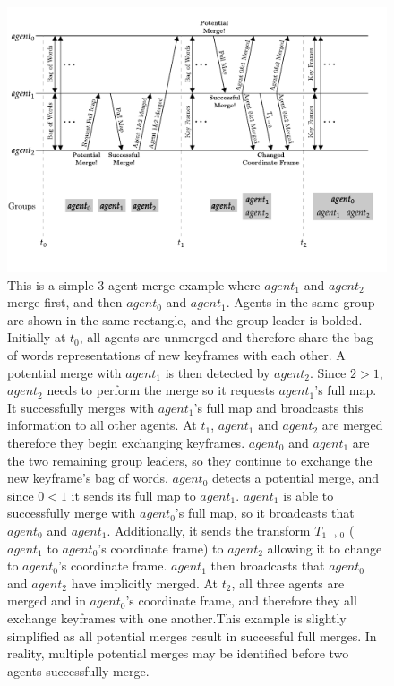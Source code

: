 \begin{figure}[h]
    \centering
    \captionsetup{format=plain}
    \includegraphics[]{figures/3_agent_merge.pdf}

    \caption{This is a simple 3 agent merge example where $agent_1$ and $agent_2$ merge first, and then $agent_0$ and $agent_1$. Agents in the same group are shown in the same rectangle, and the group leader is bolded. \captionbreak Initially at $t_0$, all agents are unmerged and therefore share the bag of words representations of new keyframes with each other. A potential merge with $agent_1$ is then detected by $agent_2$. Since $2>1$, $agent_2$ needs to perform the merge so it requests $agent_1$'s full map. It successfully merges with $agent_1$'s full map and broadcasts this information to all other agents. \captionbreak At $t_1$, $agent_1$ and $agent_2$ are merged therefore they begin exchanging keyframes. $agent_0$ and $agent_1$ are the two remaining group leaders, so they continue to exchange the new keyframe's bag of words. $agent_0$ detects a potential merge, and since $0<1$ it sends its full map to $agent_1$. $agent_1$ is able to successfully merge with $agent_0$'s full map, so it broadcasts that $agent_0$ and $agent_1$. Additionally, it sends the transform $T_{1 \to 0}$ ($agent_1$ to $agent_0$'s coordinate frame) to $agent_2$ allowing it to change to $agent_0$'s coordinate frame. $agent_1$ then broadcasts that $agent_0$ and $agent_2$ have implicitly merged. \captionbreak At $t_2$, all three agents are merged and in $agent_0$'s coordinate frame, and therefore they all exchange keyframes with one another.\captionbreak This example is slightly simplified as all potential merges result in successful full merges. In reality, multiple potential merges may be identified before two agents successfully merge.}
    \label{fig:3-agent-merge}
\end{figure}

